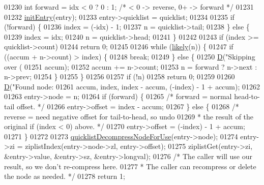 \begin{DoxyCode}
{{{{{{{{01230     \textcolor{keywordtype}{int} forward = idx < 0 ? 0 : 1; \textcolor{comment}{/* < 0 -> reverse, 0+ -> forward */}
01231 
01232     \hyperlink{quicklist_8c_abe57c7a46b2e8ec8e138de8cbe5e660a}{initEntry}(entry);
01233     entry->quicklist = quicklist;
01234 
01235     \textcolor{keywordflow}{if} (!forward) \{
01236         index = (-idx) - 1;
01237         n = quicklist->tail;
01238     \} \textcolor{keywordflow}{else} \{
01239         index = idx;
01240         n = quicklist->head;
01241     \}
01242 
01243     \textcolor{keywordflow}{if} (index >= quicklist->count)
01244         \textcolor{keywordflow}{return} 0;
01245 
01246     \textcolor{keywordflow}{while} (\hyperlink{quicklist_8c_a217a0bd562b98ae8c2ffce44935351e1}{likely}(n)) \{
01247         \textcolor{keywordflow}{if} ((accum + n->count) > index) \{
01248             \textcolor{keywordflow}{break};
01249         \} \textcolor{keywordflow}{else} \{
01250             \hyperlink{debugmacro_8h_a74021f021dcdfbb22891787b79c5529d}{D}(\textcolor{stringliteral}{"Skipping over (%
01251               accum);
01252             accum += n->count;
01253             n = forward ? n->next : n->prev;
01254         \}
01255     \}
01256 
01257     \textcolor{keywordflow}{if} (!n)
01258         \textcolor{keywordflow}{return} 0;
01259 
01260     \hyperlink{debugmacro_8h_a74021f021dcdfbb22891787b79c5529d}{D}(\textcolor{stringliteral}{"Found node: %
01261       accum, index, index - accum, (-index) - 1 + accum);
01262 
01263     entry->node = n;
01264     \textcolor{keywordflow}{if} (forward) \{
01265         \textcolor{comment}{/* forward = normal head-to-tail offset. */}
01266         entry->offset = index - accum;
01267     \} \textcolor{keywordflow}{else} \{
01268         \textcolor{comment}{/* reverse = need negative offset for tail-to-head, so undo}
01269 \textcolor{comment}{         * the result of the original if (index < 0) above. */}
01270         entry->offset = (-index) - 1 + accum;
01271     \}
01272 
01273     \hyperlink{quicklist_8c_a2f30e6f482d51059f06fa34df69734e1}{quicklistDecompressNodeForUse}(entry->node);
01274     entry->zi = ziplistIndex(entry->node->zl, entry->offset);
01275     ziplistGet(entry->zi, &entry->value, &entry->sz, &entry->longval);
01276     \textcolor{comment}{/* The caller will use our result, so we don't re-compress here.}
01277 \textcolor{comment}{     * The caller can recompress or delete the node as needed. */}
01278     \textcolor{keywordflow}{return} 1;
}}}}}}}}}}
\end{DoxyCode}

